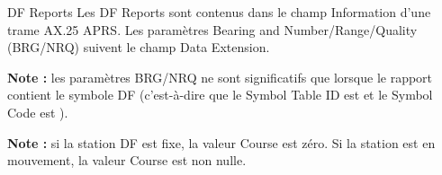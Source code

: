 \begin{aprssideblock}{DF Reports}
Les DF Reports sont contenus dans le champ Information d'une trame AX.25
APRS. Les paramètres Bearing and Number/Range/Quality (BRG/NRQ) suivent
le champ Data Extension.

\textbf{Note :} les paramètres BRG/NRQ ne sont significatifs que lorsque
le rapport contient le symbole DF (c'est-à-dire que le Symbol Table ID
est \lit{/} et le Symbol Code est \lit{\textbackslash}).

\textbf{Note :} si la station DF est fixe, la valeur Course est zéro. Si
la station est en mouvement, la valeur Course est non nulle.
\end{aprssideblock}

\begingroup
\setlength{\arrayrulewidth}{0.6pt}
